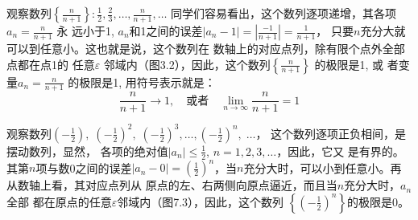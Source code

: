 \begin{example}
观察数列$\left\{\frac{n}{n+1}\right\}: \frac{1}{2},\frac{2}{3},\ldots,\frac{n}{n+1},\ldots$
同学们容易看出，这个数列逐项递增，其各项$a_n=\frac{n}{n+1}$
永
远小于1, $a_n$和1之间的误差$|a_n-1|=\left|\frac{-1}{n+1}\right|=\frac{1}{n+1}$，
只要$n$充分大就可以到任意小。这也就是说，这个数列在
数轴上的对应点列，除有限个点外全部点都在点1的 任意$\varepsilon$
邻域内（图3.2），因此，这个数列$\left\{\frac{n}{n+1}\right\}$
的极限是1, 或
者变量$a_n=\frac{n}{n+1}$
的极限是1, 用符号表示就是：
\[\frac{n}{n+1}\to 1,\quad \text{或者}\quad \lim_{n\to\infty}\frac{n}{n+1}=1\]
\begin{figure}[htp]
    \centering
{}  
    \caption{}
\end{figure}
\end{example}

\begin{example}
    观察数列$\left(-\frac{1}{2}\right),\; \left(-\frac{1}{2}\right)^2,\; \left(-\frac{1}{2}\right)^3,\ldots,\left(-\frac{1}{2}\right)^n,\;\ldots$， 这个数列逐项正负相间，是摆动数列，显然，
    各项的绝对值$|a_n|\le\frac{1}{2}$, $n=1,2,3,\ldots$，因此，它又
    是有界的。其第$n$项与数0之间的误差$|a_n-0|=\left(\frac{1}{2}\right)^n$，当$n$充分大时，可以小到任意小。再从数轴上看，其对应点列从
    原点的左、右两侧向原点逼近，而且当$n$充分大时，$a_n$全部
    都在原点的任意$\varepsilon$邻域内（图7.3），因此，这个数列
$\left\{\left(-\frac{1}{2}\right)^n\right\}$的极限是0。
\begin{figure}[htp]
    \centering
    \caption{}
\end{figure}
\end{example}

